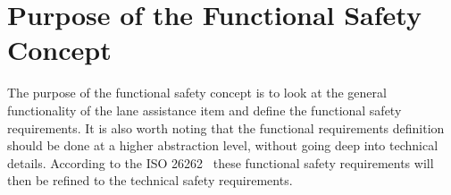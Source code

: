 \chapter{Purpose of the Functional Safety Concept}
\label{ch:purpose}


The purpose of the functional safety concept is to look at the general
functionality of the lane assistance item and define the functional
safety requirements. It is also worth noting that the functional requirements
definition should be done at a higher abstraction level, without going deep
into technical details.
According to the ISO 26262~\cite{iso26262} these functional safety requirements
will then be refined to the technical safety requirements.
